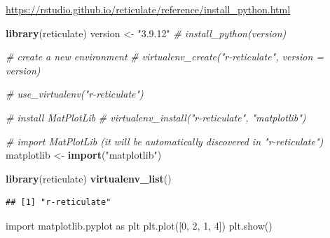 \documentclass[
]{book}
\newenvironment{Shaded}{\begin{snugshade}}{\end{snugshade}}
\newcommand{\CommentTok}[1]{\textcolor[rgb]{0.56,0.35,0.01}{\textit{#1}}}
\newcommand{\DecValTok}[1]{\textcolor[rgb]{0.00,0.00,0.81}{#1}}
\newcommand{\FunctionTok}[1]{\textcolor[rgb]{0.13,0.29,0.53}{\textbf{#1}}}
\newcommand{\ImportTok}[1]{#1}
\newcommand{\NormalTok}[1]{#1}
\newcommand{\OtherTok}[1]{\textcolor[rgb]{0.56,0.35,0.01}{#1}}
\newcommand{\StringTok}[1]{\textcolor[rgb]{0.31,0.60,0.02}{#1}}
\theoremstyle{definition}
\theoremstyle{definition}
\theoremstyle{definition}
\theoremstyle{definition}
\theoremstyle{remark}
\begin{document}
\url{https://rstudio.github.io/reticulate/reference/install_python.html}

\begin{Shaded}
\begin{Highlighting}[]
\FunctionTok{library}\NormalTok{(reticulate)}
\NormalTok{version }\OtherTok{\textless{}{-}} \StringTok{"3.9.12"}
\CommentTok{\# install\_python(version)}

\CommentTok{\# create a new environment }
\CommentTok{\# virtualenv\_create("r{-}reticulate", version = version)}

\CommentTok{\# use\_virtualenv("r{-}reticulate")}

\CommentTok{\# install MatPlotLib}
\CommentTok{\# virtualenv\_install("r{-}reticulate", "matplotlib")}

\CommentTok{\# import MatPlotLib (it will be automatically discovered in "r{-}reticulate")}
\NormalTok{matplotlib }\OtherTok{\textless{}{-}} \FunctionTok{import}\NormalTok{(}\StringTok{"matplotlib"}\NormalTok{)}
\end{Highlighting}
\end{Shaded}

\begin{Shaded}
\begin{Highlighting}[]
\FunctionTok{library}\NormalTok{(reticulate)}
\FunctionTok{virtualenv\_list}\NormalTok{()}
\end{Highlighting}
\end{Shaded}

\begin{verbatim}
## [1] "r-reticulate"
\end{verbatim}

\begin{Shaded}
\end{Shaded}

\begin{Shaded}
\begin{Highlighting}[]
\ImportTok{import}\NormalTok{ matplotlib.pyplot }\ImportTok{as}\NormalTok{ plt}
\NormalTok{plt.plot([}\DecValTok{0}\NormalTok{, }\DecValTok{2}\NormalTok{, }\DecValTok{1}\NormalTok{, }\DecValTok{4}\NormalTok{])}
\NormalTok{plt.show()}
\end{Highlighting}
\end{Shaded}
\end{document}
